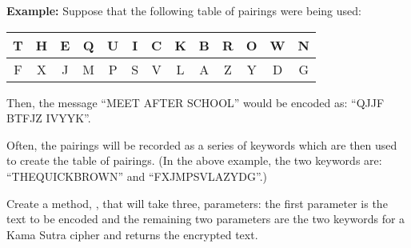 \begin{questions}
    {\small\textbf{Example:} Suppose that the following table of pairings were being used:
      \begin{center}
        \begin{tabular}{| c | c | c | c | c | c | c | c | c | c | c | c | c |}
          \hline
          T & H & E & Q & U & I & C & K & B & R & O & W & N\\
          \hline
          F & X & J & M & P & S & V & L & A & Z & Y & D & G\\
          \hline
        \end{tabular}
      \end{center}
    Then, the message ``MEET AFTER SCHOOL'' would be encoded as: ``QJJF BTFJZ IVYYK''.

    Often, the pairings will be recorded as a series of keywords which are then used to create the table of pairings. (In the above example, the two keywords are: ``THEQUICKBROWN'' and ``FXJMPSVLAZYDG''.)}

    Create a method, , that will take three,  parameters: the first parameter is the text to be encoded and the remaining two parameters are the two keywords for a Kama Sutra cipher and returns the encrypted text.
  \end{questions}


